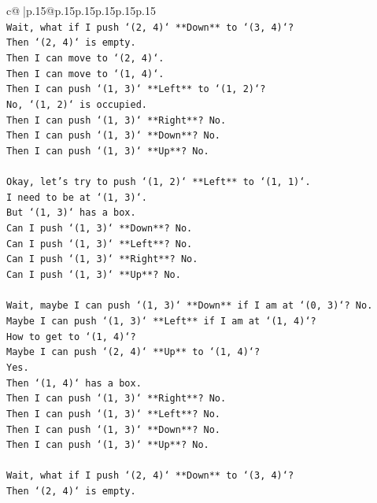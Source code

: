 \documentclass{article}
\begin{document}
{\begin{supertabular}{c@{$\;$}|p{.15\linewidth}@{}p{.15\linewidth}p{.15\linewidth}p{.15\linewidth}p{.15\linewidth}p{.15\linewidth}}
{{{\\ 
\texttt{Wait, what if I push `(2, 4)` **Down** to `(3, 4)`?} \\
\texttt{Then `(2, 4)` is empty.} \\
\texttt{Then I can move to `(2, 4)`.} \\
\texttt{Then I can move to `(1, 4)`.} \\
\texttt{Then I can push `(1, 3)` **Left** to `(1, 2)`?} \\
\texttt{No, `(1, 2)` is occupied.} \\
\texttt{Then I can push `(1, 3)` **Right**? No.} \\
\texttt{Then I can push `(1, 3)` **Down**? No.} \\
\texttt{Then I can push `(1, 3)` **Up**? No.} \\
\\ 
\texttt{Okay, let's try to push `(1, 2)` **Left** to `(1, 1)`.} \\
\texttt{I need to be at `(1, 3)`.} \\
\texttt{But `(1, 3)` has a box.} \\
\texttt{Can I push `(1, 3)` **Down**? No.} \\
\texttt{Can I push `(1, 3)` **Left**? No.} \\
\texttt{Can I push `(1, 3)` **Right**? No.} \\
\texttt{Can I push `(1, 3)` **Up**? No.} \\
\\ 
\texttt{Wait, maybe I can push `(1, 3)` **Down** if I am at `(0, 3)`? No.} \\
\texttt{Maybe I can push `(1, 3)` **Left** if I am at `(1, 4)`?} \\
\texttt{How to get to `(1, 4)`?} \\
\texttt{Maybe I can push `(2, 4)` **Up** to `(1, 4)`?} \\
\texttt{Yes.} \\
\texttt{Then `(1, 4)` has a box.} \\
\texttt{Then I can push `(1, 3)` **Right**? No.} \\
\texttt{Then I can push `(1, 3)` **Left**? No.} \\
\texttt{Then I can push `(1, 3)` **Down**? No.} \\
\texttt{Then I can push `(1, 3)` **Up**? No.} \\
\\ 
\texttt{Wait, what if I push `(2, 4)` **Down** to `(3, 4)`?} \\
\texttt{Then `(2, 4)` is empty.} \\
}}}
\end{supertabular}}
\end{document}
